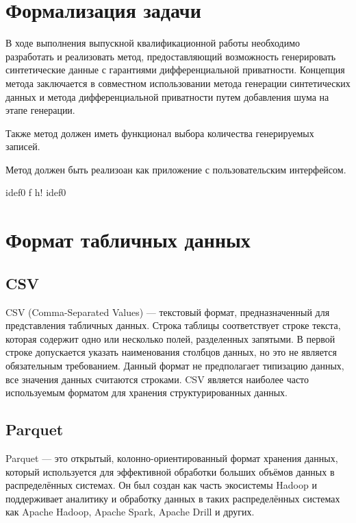 \newpage
\section{Формализация задачи}

В ходе выполнения выпускной квалификационной работы необходимо разработать и реализовать метод, предоставляющий возможность генерировать синтетические данные с гарантиями дифференциальной приватности. Концепция метода заключается в совместном использовании метода генерации синтетических данных и метода дифференциальной приватности путем добавления шума на этапе генерации.

Также метод должен иметь функционал выбора количества генерируемых записей.

Метод должен быть реализоан как приложение с пользовательским интерфейсом.

{idef0} %
{f} %
{h!} %
{\textwidth} %
{idef0} %


\section{Формат табличных данных}
\subsection{CSV}
CSV (Comma-Separated Values) --- текстовый формат, предназначенный для представления табличных данных. 
Строка таблицы соответствует строке текста, которая содержит одно или несколько полей, разделенных запятыми.
В первой строке допускается указать наименования столбцов данных, но это не является обязательным требованием.
Данный формат не предполагает типизацию данных, все значения данных считаются строками.
CSV является наиболее часто используемым форматом для хранения структурированных данных.

\subsection{Parquet}
Parquet --- это открытый, колонно-ориентированный формат хранения данных, который используется для эффективной обработки больших объёмов данных в распределённых системах.
Он был создан как часть экосистемы Hadoop и поддерживает аналитику и обработку данных в таких распределённых системах как Apache Hadoop,
Apache Spark, Apache Drill и других.
